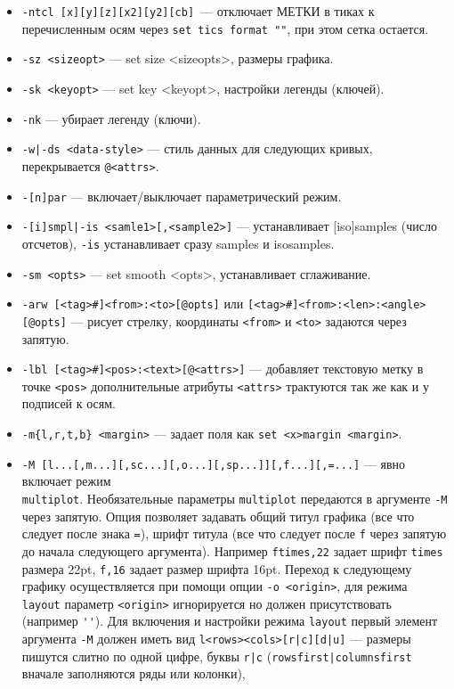 \documentclass[12pt]{article}
\begin{document}
\begin{itemize}
\item \verb'-ntcl [x][y][z][x2][y2][cb]'~---  отключает МЕТКИ в тиках к перечисленным осям через 
  \verb'set tics format ""', при этом сетка остается.
\item \verb'-sz <sizeopt>' ---  set size <sizeopts>, размеры графика. 
\item \verb'-sk <keyopt>' --- set key <keyopt>, настройки легенды (ключей).
\item \verb'-nk' --- убирает легенду (ключи). 
\item \verb'-w|-ds <data-style>'  --- стиль данных для следующих кривых, перекрывается \verb'@<attrs>'.
\item \verb'-[n]par' --- включает/выключает параметрический режим.
\item \verb'-[i]smpl|-is <samle1>[,<sample2>]' --- устанавливает [iso]samples (число отсчетов), 
  \verb'-is' устанавливает сразу samples и isosamples.
\item \verb'-sm <opts>' --- set smooth <opts>, устанавливает сглаживание.
\item \verb'-arw [<tag>#]<from>:<to>[@opts]' или \verb'[<tag>#]<from>:<len>:<angle>[@opts]' --- рисует стрелку,
  координаты \verb'<from>' и \verb'<to>' задаются через запятую.
\item \verb'-lbl [<tag>#]<pos>:<text>[@<attrs>]' --- добавляет текстовую метку в точке \verb'<pos>'
   дополнительные атрибуты \verb'<attrs>' трактуются так же как и у подписей к осям.
\item \verb'-m{l,r,t,b} <margin>' ---  задает поля как \verb'set <x>margin <margin>'.
\item \verb'-M [l...[,m...][,sc...][,o...][,sp...]][,f...][,=...]' --- явно включает режим\\ \verb'multiplot'.
Необязательные параметры \verb'multiplot' передаются в аргументе \verb'-M'  через запятую.
Опция позволяет задавать общий титул графика (все что следует после знака \verb'='),
шрифт титула (все что следует после \verb'f' через запятую до начала следующего аргумента).
Например \verb'ftimes,22' задает шрифт \verb'times' размера 22pt,  \verb'f,16' задает размер шрифта 16pt.
Переход к следующему графику осуществляется при помощи опции \verb'-o <origin>', для 
режима \verb'layout' параметр  \verb'<origin>' игнорируется но должен присутствовать (например \verb|''|). 
Для включения и настройки режима \verb'layout' первый элемент аргумента \verb'-M' должен иметь вид
\verb'l<rows><cols>[r|с][d|u]' ---  размеры пишутся слитно по одной 
цифре, буквы \verb'r|с' (\verb'rowsfirst|columnsfirst' вначале заполняются ряды или колонки),

\end{itemize}
\end{document}
